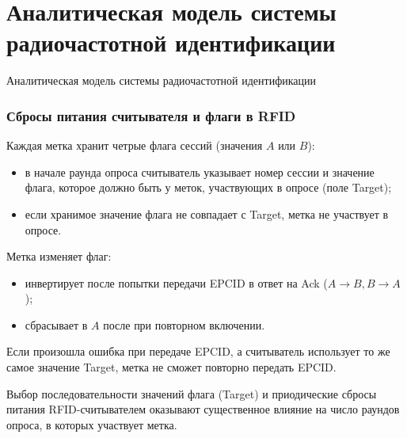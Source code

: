\section{Аналитическая модель системы радиочастотной идентификации}
\begin{frame}
    \begin{center}
        \Huge
        Аналитическая модель системы радиочастотной идентификации
    \end{center}
\end{frame}

\begin{frame}
    \frametitle{Сбросы питания считывателя и флаги в RFID}
    Каждая метка хранит четрые флага сессий (значения $A$ или $B$):
    \small
    \begin{itemize}
        \item в начале раунда опроса считыватель указывает номер сессии и значение флага, которое должно быть у меток, участвующих в опросе (поле Target);
        \item если хранимое значение флага не совпадает с Target, метка не участвует в опросе.
    \end{itemize}
    \vfill
    Метка изменяет флаг:
    \small
    \begin{itemize}
        \item инвертирует после попытки передачи EPCID в ответ на Ack ($A \rightarrow B, B \rightarrow A$);
        \item сбрасывает в $A$ после при повторном включении.
    \end{itemize}
    \vfill
    Если произошла ошибка при передаче EPCID, а считыватель использует то же самое значение Target, метка не сможет повторно передать EPCID.
    \begin{block}{}
        Выбор последовательности значений флага (Target) и приодические сбросы питания RFID-считывателем оказывают существенное влияние на число раундов опроса, в которых участвует метка.
    \end{block}
\end{frame}


